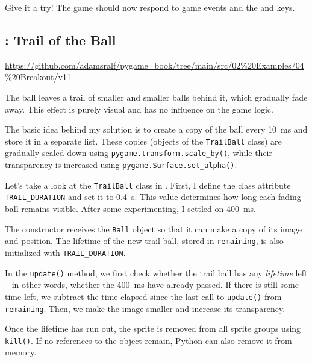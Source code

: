 Give it a try! The game should now respond to game events and the  and  keys.

\newpage
\subsection{: Trail of the Ball}

\begin{diskbox}
	\url{https://github.com/adamsralf/pygame_book/tree/main/src/02%20Examples/04%20Breakout/v11}
\end{diskbox}

	The ball leaves a trail of smaller and smaller balls behind it, which gradually fade away. This effect is purely visual and has no influence on the game logic.
\er

The basic idea behind my solution is to create a copy of the ball every \SI{10}{ms} and store it in a separate list. These copies (objects of the \texttt{TrailBall} class) are gradually scaled down using \texttt{pygame.transform.scale\_by()}, while their transparency is increased using \texttt{pygame.Surface.set\_alpha()}.

Let's take a look at the \texttt{TrailBall} class in . First, I define the class attribute \texttt{TRAIL\_DURATION} and set it to \SI{0.4}{\second}. This value determines how long each fading ball remains visible. After some experimenting, I settled on \SI{400}{\milli\second}.

The constructor receives the \texttt{Ball} object so that it can make a copy of its image and position. The lifetime of the new trail ball, stored in \texttt{remaining}, is also initialized with \texttt{TRAIL\_DURATION}.

In the \texttt{update()} method, we first check whether the trail ball has any \emph{lifetime} left -- in other words, whether the \SI{400}{\milli\second} have already passed. If there is still some time left, we subtract the time elapsed since the last call to \texttt{update()} from \texttt{remaining}. Then, we make the image smaller and increase its transparency.

Once the lifetime has run out, the sprite is removed from all sprite groups using \texttt{kill()}. If no references to the object remain, Python can also remove it from memory.

